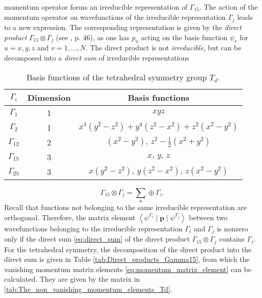 momentum operator forms an irreducible representation of $\Gamma_{15}$.
The action of the momentum operator on wavefunctions of the irreducible
representation $\Gamma_{j}$ leads to a new expression. The corresponding
representation is given by the \emph{direct product} $\Gamma_{15}\otimes\Gamma_{j}$
(see \citet{Yu2005}, p. 46), as one has $p_{u}$ acting on the basis
function $\psi_{v}$ for $u=x,y,z$ and $v=1,...,N$. The direct product
is not \emph{irreducible}, but can be decomposed into a \emph{direct
sum} of irreducible representations %
\begin{table}
\begin{centering}
\begin{tabular}{ccc}
\toprule 
\textbf{$\Gamma_{i}$} & \textbf{Dimension} & \textbf{Basis functions}\tabularnewline
\midrule
\midrule 
$\Gamma_{1}$ & 1 & $xyz$\tabularnewline
\midrule 
$\Gamma_{2}$ & 1 & $x^{4}\left(y^{2}-z^{2}\right)+y^{4}\left(z^{2}-x^{2}\right)+z^{2}\left(x^{2}-y^{2}\right)$\tabularnewline
\midrule 
$\Gamma_{12}$ & 2 & $\left(x^{2}-y^{2}\right),\, z^{2}-\frac{1}{2}\left(x^{2}+y^{2}\right)$\tabularnewline
\midrule 
$\Gamma_{15}$ & 3 & $x,\, y,\, z$\tabularnewline
\midrule 
$\Gamma_{25}$ & 3 & $x\left(y^{2}-z^{2}\right),\, y\left(z^{2}-x^{2}\right),\, z\left(x^{2}-y^{2}\right)$\tabularnewline
\bottomrule
\end{tabular}
\par\end{centering}

\caption{\label{tab:Basis_functions_Td}Basis functions of the tetrahedral
symmetry group $T_{d}$.}

\end{table}
\begin{equation}
\Gamma_{15}\otimes\Gamma_{j}=\sum_{u}\oplus\Gamma_{i}.\label{eq:direct_sum}\end{equation}
Recall that functions not belonging to the same irreducible representation
are orthogonal. Therefore, the matrix element $\left\langle \psi^{\Gamma_{i}}\mid\mathbf{p}\mid\psi^{\Gamma_{j}}\right\rangle $
between two wavefunctions belonging to the irreducible representation
$\Gamma_{i}$ and $\Gamma_{j}$ is nonzero only if the direct sum
\ref{eq:direct_sum} of the direct product $\Gamma_{15}\otimes\Gamma_{j}$
contains $\Gamma_{i}$. For the tetrahedral symmetry, the decomposition
of the direct product into the direct sum is given in Table \ref{tab:Direct_products_Gamma15},
from which the vanishing momentum matrix elements \ref{eq:momentum_matrix_element}
can be calculated. They are given by the matrix in \ref{tab:The_non_vanishing_momentum_elements_Td}.
